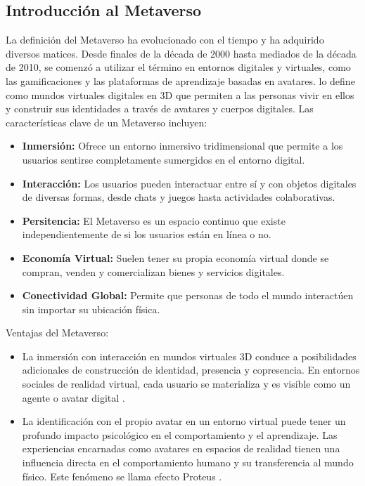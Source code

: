 \documentclass[a4paper,10pt]{article}
\begin{document}
	 \subsection{Introducción al Metaverso}
	{\normalsize La definición del Metaverso ha evolucionado con el tiempo y ha adquirido diversos matices. Desde finales de la década de 2000 hasta mediados de la década de 2010, se comenzó a utilizar el término en entornos digitales y virtuales, como las gamificaciones y las plataformas de aprendizaje basadas en avatares. \textcite{schlemmer2009metaverse} lo define como mundos virtuales digitales en 3D que permiten a las personas vivir en ellos y construir sus identidades a través de avatares y cuerpos digitales. Las características clave de un Metaverso incluyen: \parencite{nieto2022introduccion}
	 		\begin{itemize}
	 		\item \textbf{Inmersión:} Ofrece un entorno inmersivo tridimensional que permite a los usuarios sentirse completamente sumergidos en el entorno digital.
	 		\item \textbf{Interacción:} Los usuarios pueden interactuar entre sí y con objetos digitales de diversas formas, desde chats y juegos hasta actividades colaborativas.
	 		\item \textbf{Persitencia:} El Metaverso es un espacio continuo que existe independientemente de si los usuarios están en línea o no.
	 		\item \textbf{Economía Virtual: }Suelen tener su propia economía virtual donde se compran, venden y comercializan bienes y servicios digitales.
	 		\item \textbf{Conectividad Global: }Permite que personas de todo el mundo interactúen sin importar su ubicación física.
	 	\end{itemize}
	 	Ventajas del Metaverso:
	 	\begin{itemize}
	 		\item La inmersión con interacción en mundos virtuales 3D conduce a posibilidades adicionales de construcción de identidad, presencia y copresencia. En entornos sociales de realidad virtual, cada usuario se materializa y es visible como un agente o avatar digital \parencite{dalgarno2010learning}.
	 		\item La identificación con el propio avatar en un entorno virtual puede tener un profundo impacto psicológico en el comportamiento y el aprendizaje. Las experiencias encarnadas como avatares en espacios de realidad tienen una influencia directa en el comportamiento humano y su transferencia al mundo físico. Este fenómeno se llama efecto Proteus \parencite{yee2007proteus}.

\end{itemize}}
\end{document}
